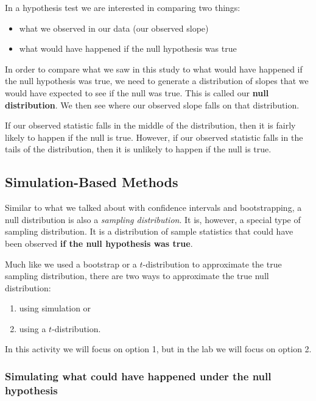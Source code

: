 \documentclass[
  letterpaper,
  DIV=11,
  numbers=noendperiod]{scrartcl}
\providecommand{\tightlist}{%
  \setlength{\itemsep}{0pt}\setlength{\parskip}{0pt}}\usepackage{longtable,booktabs,array}
\begin{document}
In a hypothesis test we are interested in comparing two things:

\begin{itemize}
\tightlist
\item
  what we observed in our data (our observed slope)
\item
  what would have happened if the null hypothesis was true
\end{itemize}

In order to compare what we saw in this study to what would have
happened if the null hypothesis was true, we need to generate a
distribution of slopes that we would have expected to see if the null
was true. This is called our \textbf{null distribution}. We then see
where our observed slope falls on that distribution.

If our observed statistic falls in the middle of the distribution, then
it is fairly likely to happen if the null is true. However, if our
observed statistic falls in the tails of the distribution, then it is
unlikely to happen if the null is true.

\hypertarget{simulation-based-methods}{%
\subsection{Simulation-Based Methods}\label{simulation-based-methods}}

Similar to what we talked about with confidence intervals and
bootstrapping, a null distribution is also a \emph{sampling
distribution}. It is, however, a special type of sampling distribution.
It is a distribution of sample statistics that could have been observed
\textbf{if the null hypothesis was true}.

Much like we used a bootstrap or a \(t\)-distribution to approximate the
true sampling distribution, there are two ways to approximate the true
null distribution:

\begin{enumerate}
\def\labelenumi{(\arabic{enumi})}
\item
  using simulation or
\item
  using a \(t\)-distribution.
\end{enumerate}

In this activity we will focus on option 1, but in the lab we will focus
on option 2.

\hypertarget{simulating-what-could-have-happened-under-the-null-hypothesis}{%
\subsubsection{Simulating what could have happened under the null
hypothesis}\label{simulating-what-could-have-happened-under-the-null-hypothesis}}
\end{document}

